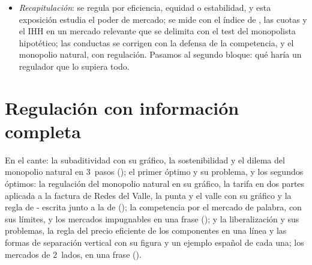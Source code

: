 \documentclass[11pt]{article}
\begin{document}
\begin{infografia}[H]
\centering
\caption{Algoritmo de la regulación del poder de mercado, ampliado: la hoja de ruta de la exposición}\label{figu:algoritmo-regulacion}
\end{infografia}

\begin{itemize}
\item \emph{Recapitulación}: se regula por eficiencia, equidad o estabilidad, y esta exposición estudia el poder de mercado; se mide con el índice de , las cuotas y el IHH en un mercado relevante que se delimita con el test del monopolista hipotético; las conductas se corrigen con la defensa de la competencia, y el monopolio natural, con regulación. Pasamos al segundo bloque: qué haría un regulador que lo supiera todo.
\end{itemize}


\section{Regulación con información completa}\label{sec:informacion-completa}

\begin{notaopositor}
En el cante: la subaditividad con su gráfico, la sostenibilidad y el dilema del monopolio natural en 3~pasos (); el primer óptimo y su problema, y los segundos óptimos: la regulación del monopolio natural en su gráfico, la tarifa en dos partes aplicada a la factura de Redes del Valle, la punta y el valle con su gráfico y la regla de - escrita junto a la de  (); la competencia por el mercado de palabra, con sus límites, y los mercados impugnables en una frase (); y la liberalización y sus problemas, la regla del precio eficiente de los componentes en una línea y las formas de separación vertical con su figura y un ejemplo español de cada una; los mercados de 2~lados, en una frase ().
\end{notaopositor}
\end{document}
